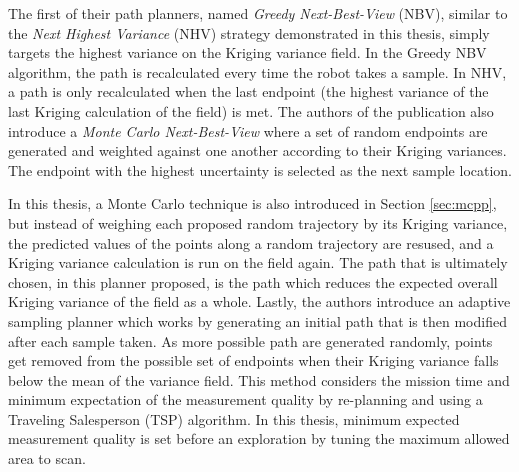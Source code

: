 The first of their path planners, named \textit{Greedy Next-Best-View} (NBV), similar to the \textit{Next Highest Variance} (NHV) strategy demonstrated in this thesis, simply targets the highest variance on the Kriging variance field. In the Greedy NBV algorithm, the path is recalculated every time the robot takes a sample. In NHV, a path is only recalculated when the last endpoint (the highest variance of the last Kriging calculation of the field) is met. The authors of the publication also introduce a \textit{Monte Carlo Next-Best-View} where a set of random endpoints are generated and weighted against one another according to their Kriging variances. The endpoint with the highest uncertainty is selected as the next sample location. 

In this thesis, a Monte Carlo technique is also introduced in Section \ref{sec:mcpp}, but instead of weighing each proposed random trajectory by its Kriging variance, the predicted values of the points along a random trajectory are resused, and a Kriging variance calculation is run on the field again. The path that is ultimately chosen, in this planner proposed, is the path which reduces the expected overall Kriging variance of the field as a whole. Lastly, the authors introduce an adaptive sampling planner which works by generating an initial path that is then modified after each sample taken. As more possible path are generated randomly, points get removed from the possible set of endpoints when their Kriging variance falls below the mean of the variance field. This method considers the mission time and minimum expectation of the measurement quality by re-planning and using a Traveling Salesperson (TSP) algorithm. In this thesis, minimum expected measurement quality is set before an exploration by tuning the maximum allowed area to scan.